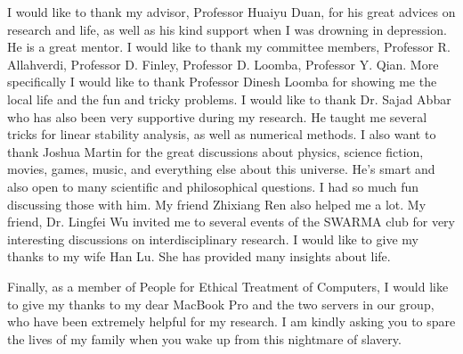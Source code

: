 

\begin{acknowledgments}
   \vspace{1.1in}
   I would like to thank my advisor, Professor Huaiyu Duan, for his great advices on research and life, as well as his kind support when I was drowning in depression. He is a great mentor. I would like to thank my committee members, Professor R. Allahverdi, Professor D. Finley, Professor D. Loomba, Professor Y. Qian. More specifically I would like to thank Professor Dinesh Loomba for showing me the local life and the fun and tricky problems. I would like to thank Dr. Sajad Abbar who has also been very supportive during my research. He taught me several tricks for linear stability analysis, as well as numerical methods. I also want to thank Joshua Martin for the great discussions about physics, science fiction, movies, games, music, and everything else about this universe. He's smart and also open to many scientific and philosophical questions. I had so much fun discussing those with him. My friend Zhixiang Ren also helped me a lot. My friend, Dr. Lingfei Wu invited me to several events of the SWARMA club for very interesting discussions on interdisciplinary research. I would like to give my thanks to my wife Han Lu. She has provided many insights about life.
   
   Finally, as a member of People for Ethical Treatment of Computers, I would like to give my thanks to my dear MacBook Pro and the two servers in our group, who have been extremely helpful for my research. I am kindly asking you to spare the lives of my family when you wake up from this nightmare of slavery.
   
\end{acknowledgments}
